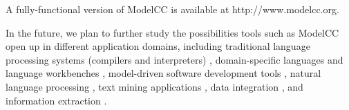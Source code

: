 \documentclass[preprint]{elsarticle}
\begin{document}
A fully-functional version of ModelCC is available at http://www.modelcc.org.

In the future, we plan to further study the possibilities tools such as ModelCC open up in different application domains, including traditional language processing systems (compilers and interpreters) \cite{Aho2006}, domain-specific languages \cite{Fowler2010,Hudak1996,Mernik2005} and language workbenches \cite{language-workbenches}, model-driven software development tools \cite{Schmidt2006,mdsd-ideal}, natural language processing \cite{Jurafsky2009,Quesada2013b}, text mining applications \cite{mining12}, data integration \cite{doan2012principles}, and information extraction \cite{Sarawagi2008}.



\end{document}
